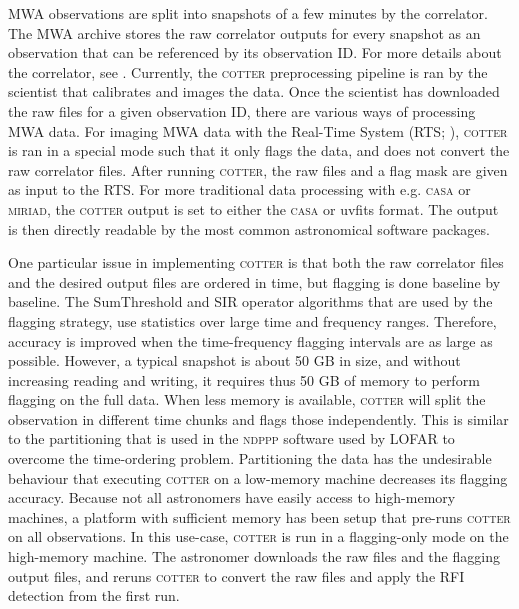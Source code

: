 \documentclass{pasa}
\begin{document}
MWA observations are split into snapshots of a few minutes by the correlator. The MWA archive stores the raw correlator outputs for every snapshot as an observation that can be referenced by its observation ID. For more details about the correlator, see \citet{ord-2014-mwa-fpga-gpu}. Currently, the \textsc{cotter} preprocessing pipeline is ran by the scientist that calibrates and images the data. Once the scientist has downloaded the raw files for a given observation ID, there are various ways of processing MWA data. For imaging MWA data with the Real-Time System (RTS; \citealt{rts-mwa-2008}), \textsc{cotter} is ran in a special mode such that it only flags the data, and does not convert the raw correlator files. After running \textsc{cotter}, the raw files and a flag mask are given as input to the RTS. For more traditional data processing with e.g. \textsc{casa} or \textsc{miriad}, the \textsc{cotter} output is set to either the \textsc{casa} or uvfits format. The output is then directly readable by the most common astronomical software packages.

One particular issue in implementing \textsc{cotter} is that both the raw correlator files and the desired output files are ordered in time, but flagging is done baseline by baseline. The SumThreshold and SIR operator algorithms that are used by the flagging strategy, use statistics over large time and frequency ranges. Therefore, accuracy is improved when the time-frequency flagging intervals are as large as possible. However, a typical snapshot is about 50 GB in size, and without increasing reading and writing, it requires thus 50 GB of memory to perform flagging on the full data. When less memory is available, \textsc{cotter} will split the observation in different time chunks and flags those independently. This is similar to the partitioning that is used in the \textsc{ndppp} software used by LOFAR \citep{lofar-imaging-cookbook} to overcome the time-ordering problem. Partitioning the data has the undesirable behaviour that executing \textsc{cotter} on a low-memory machine decreases its flagging accuracy. Because not all astronomers have easily access to high-memory machines, a platform with sufficient memory has been setup that pre-runs \textsc{cotter} on all observations. In this use-case, \textsc{cotter} is run in a flagging-only mode on the high-memory machine. The astronomer downloads the raw files and the flagging output files, and reruns \textsc{cotter} to convert the raw files and apply the RFI detection from the first run.
\end{document}
